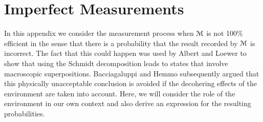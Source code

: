 \documentclass[12pt]{article}
\def\BM{{\EuScript M}}
\begin{document}
\section{Imperfect Measurements}\label{a2}

In this appendix we consider the measurement process when $\BM$ is not 100\% efficient in the sense that there is a probability that the result recorded by $\BM$ is incorrect. The fact that this could happen was used by Albert and Loewer \cite{AL1} to show that using the Schmidt decomposition leads to states that involve macroscopic superpositions. Bacciagaluppi and Hemmo \cite{BH1} subsequently argued that this physically unacceptable conclusion is avoided if the decohering effects of the environment are taken into account. Here, we will consider the role of the environment in our own 
context and also derive an expression for the resulting probabilities.
\end{document}
